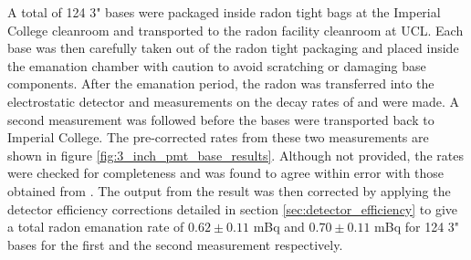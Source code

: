 A total of 124 3" bases were packaged inside radon tight bags at the Imperial College cleanroom and transported to the radon facility cleanroom at UCL. Each base was then carefully taken out of the radon tight packaging and placed inside the emanation chamber with caution to avoid scratching or damaging base components. After the emanation period, the radon was transferred into the electrostatic detector and measurements on the decay rates of \PoTOF{} and \PoTOE{} were made. A second measurement was followed before the bases were transported back to Imperial College. The pre-corrected \PoTOF{} rates from these two measurements are shown in figure \ref{fig:3_inch_pmt_base_results}. Although not provided, the \PoTOE{} rates were checked for completeness and was found to agree within error with those obtained from \PoTOF{}. The output from the \PoTOF{} result was then corrected by applying the detector efficiency corrections detailed in section \ref{sec:detector_efficiency} to give a total radon emanation rate of $0.62\pm0.11$ mBq and $0.70\pm0.11$ mBq for 124 3" bases for the first and the second measurement respectively. 
%
